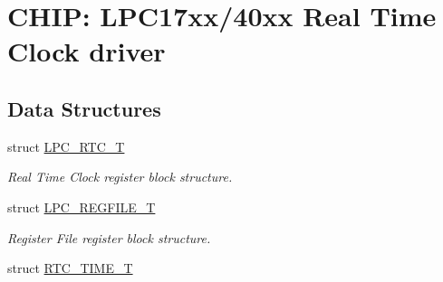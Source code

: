 \hypertarget{group__RTC__17XX__40XX}{\section{C\-H\-I\-P\-: L\-P\-C17xx/40xx Real Time Clock driver}
\label{group__RTC__17XX__40XX}
}
\subsection*{Data Structures}
\begin{DoxyCompactItemize}
\item 
struct \hyperlink{structLPC__RTC__T}{L\-P\-C\-\_\-\-R\-T\-C\-\_\-\-T}
\begin{DoxyCompactList}\small\item\em Real Time Clock register block structure. \end{DoxyCompactList}\item 
struct \hyperlink{structLPC__REGFILE__T}{L\-P\-C\-\_\-\-R\-E\-G\-F\-I\-L\-E\-\_\-\-T}
\begin{DoxyCompactList}\small\item\em Register File register block structure. \end{DoxyCompactList}\item 
struct \hyperlink{structRTC__TIME__T}{R\-T\-C\-\_\-\-T\-I\-M\-E\-\_\-\-T}
\end{DoxyCompactItemize}
